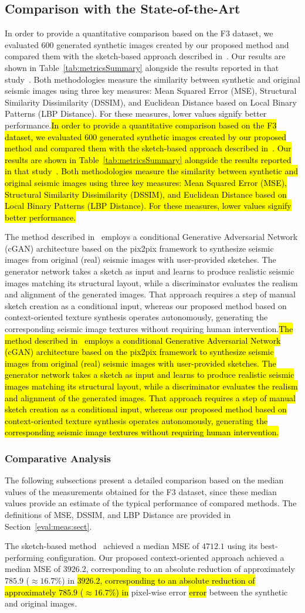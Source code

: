 \documentclass{ieeeaccess}
\makeatletter
\DeclareRobustCommand{\DIFaddbegin}{\DIFOaddbegin \let\includegraphics\DIFaddincludegraphics} %
\DeclareRobustCommand{\DIFaddend}{\DIFOaddend \let\includegraphics\DIFOincludegraphics} %
\DeclareRobustCommand{\DIFdelbegin}{\DIFOdelbegin \let\includegraphics\DIFdelincludegraphics} %
\DeclareRobustCommand{\DIFdelend}{\DIFOaddend \let\includegraphics\DIFOincludegraphics} %
\let\sout@orig\sout %
\renewcommand{\sout}[1]{\ifmmode\text{\sout@orig{\ensuremath{#1}}}\else\sout@orig{#1}\fi} %
\providecommand{\DIFadd}[1]{{\protect\color{blue}#1}}
\providecommand{\DIFdel}[1]{{\protect\color{red}\sout{#1}}}
\renewcommand{\DIFadd}[1]{\ifmmode#1\else\begingroup\let\protect\relax\hl{#1}\endgroup\fi}
\renewcommand{\DIFdel}[1]{}
\providecommand{\DIFaddbegin}{}
\providecommand{\DIFaddend}{}
\providecommand{\DIFdelbegin}{}
\providecommand{\DIFdelend}{}
\renewcommand{\DIFaddbegin}{}
\renewcommand{\DIFaddend}{}
\renewcommand{\DIFdelbegin}{}
\renewcommand{\DIFdelend}{}
\makeatother
\begin{document}
\subsection{Comparison with the State-of-the-Art}

\DIFaddbegin \DIFadd{In order to provide a quantitative comparison based on the F3 dataset, we evaluated 600 generated synthetic images created by our proposed method and compared them with the sketch-based approach described in~\cite{Ferreira2020}. Our results are shown in Table~\ref{tab:metricsSummary} alongside the results reported in that study~\cite{Ferreira2020}. Both methodologies measure the similarity between synthetic and original seismic images using three key measures: Mean Squared Error (MSE), Structural Similarity Dissimilarity (DSSIM), and Euclidean Distance based on Local Binary Patterns (LBP Distance). For these measures, lower values signify better performance.}\DIFaddend

\DIFaddbegin \DIFadd{The method described in~\cite{Ferreira2020} employs a conditional Generative Adversarial Network (cGAN) architecture based on the pix2pix framework to synthesize seismic images from original (real) seismic images with user-provided sketches. The generator network takes a sketch as input and learns to produce realistic seismic images matching its structural layout, while a discriminator evaluates the realism and alignment of the generated images. That approach requires a step of manual sketch creation as a conditional input, whereas our proposed method based on context-oriented texture synthesis operates autonomously, generating the corresponding seismic image textures without requiring human intervention.}\DIFaddend


\subsubsection{Comparative Analysis}

The following subsections present a detailed comparison based on the median values of the measurements obtained for the F3 dataset, since these median values provide an estimate of the typical performance of compared methods. The  definitions of MSE, DSSIM, and LBP Distance are provided in Section~\ref{eval:meas:sect}.

The sketch-based method~\cite{Ferreira2020} achieved a median MSE of $4712.1$ using its best-performing configuration. Our proposed context-oriented approach achieved a median MSE of \DIFdelbegin \DIFdel{$3926.2325$, potentially providing  a substantial improvement in terms of }\DIFdelend \DIFaddbegin \DIFadd{$3926.2$, corresponding to an absolute reduction of approximately $785.9$ ($\approx 16.7\%$) in }\DIFaddend pixel-wise \DIFdelbegin \DIFdel{correspondence }\DIFdelend \DIFaddbegin \DIFadd{error }\DIFaddend between the synthetic and original images.
\end{document}
